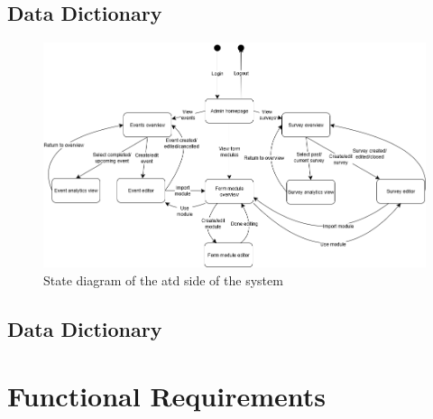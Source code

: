 \documentclass[12pt]{article}
\begin{document}
\subsection{Data Dictionary}

\begin{center}
\begin{figure}[H]
    \centering
    \includegraphics[width=1\linewidth]{images/state_diagram_attendee.png}
    \caption{State diagram of the \gls{atd} side of the system}\label{fig:stateattendee}
\end{figure}
\end{center}
\subsection{Data Dictionary}

\section{Functional Requirements}
\end{document}
